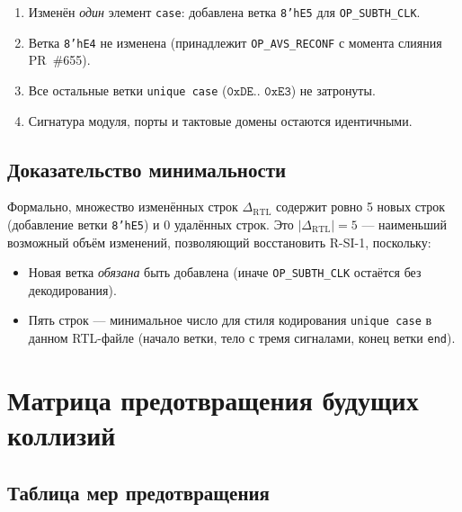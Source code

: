 \begin{enumerate}
  \item Изменён \emph{один} элемент \texttt{case}: добавлена ветка
    \texttt{8'hE5} для \texttt{OP\_SUBTH\_CLK}.
  \item Ветка \texttt{8'hE4} не изменена (принадлежит
    \texttt{OP\_AVS\_RECONF} с момента слияния PR~\#655).
  \item Все остальные ветки \texttt{unique~case} ($\mathtt{0xDE}$..
    $\mathtt{0xE3}$) не затронуты.
  \item Сигнатура модуля, порты и тактовые домены остаются идентичными.
\end{enumerate}

\subsection{Доказательство минимальности}

Формально, множество изменённых строк $\Delta_{\mathrm{RTL}}$ содержит
ровно 5 новых строк (добавление ветки \texttt{8'hE5}) и 0 удалённых строк.
Это $|\Delta_{\mathrm{RTL}}| = 5$ — наименьший возможный объём изменений,
позволяющий восстановить R-SI-1, поскольку:
\begin{itemize}
  \item Новая ветка \emph{обязана} быть добавлена (иначе
    \texttt{OP\_SUBTH\_CLK} остаётся без декодирования).
  \item Пять строк — минимальное число для стиля кодирования
    \texttt{unique~case} в данном RTL-файле (начало ветки, тело с тремя
    сигналами, конец ветки \texttt{end}).
\end{itemize}

\section{Матрица предотвращения будущих коллизий}
\label{app:prevention_matrix}


\subsection{Таблица мер предотвращения}

